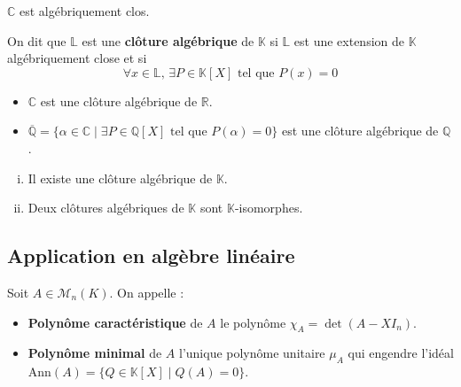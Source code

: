 	\begin{theorem}
		$\mathbb{C}$ est algébriquement clos.
	\end{theorem}
	
	\begin{definition}
		On dit que $\mathbb{L}$ est une \textbf{clôture algébrique} de $\mathbb{K}$ si $\mathbb{L}$ est une extension de $\mathbb{K}$ algébriquement close et si
		\[ \forall x \in \mathbb{L}, \, \exists P \in \mathbb{K}[X] \text{ tel que } P(x) = 0 \]
	\end{definition}
	
	\begin{example}
		\begin{itemize}
			\item $\mathbb{C}$ est une clôture algébrique de $\mathbb{R}$.
			\item $\overline{\mathbb{Q}} = \{ \alpha \in \mathbb{C} \mid \exists P \in \mathbb{Q}[X] \text{ tel que } P(\alpha) = 0 \}$ est une clôture algébrique de $\mathbb{Q}$.
		\end{itemize}
	\end{example}
	
	\begin{theorem}[Steinitz]
		\begin{enumerate}[(i)]
			\item Il existe une clôture algébrique de $\mathbb{K}$.
			\item Deux clôtures algébriques de $\mathbb{K}$ sont $\mathbb{K}$-isomorphes.
		\end{enumerate}
	\end{theorem}
	
	\subsection{Application en algèbre linéaire}
	
	
	\begin{definition}
		Soit $A \in \mathcal{M}_n(K)$. On appelle :
		\begin{itemize}
			\item \textbf{Polynôme caractéristique} de $A$ le polynôme $\chi_A = \det(A - XI_n)$.
			\item \textbf{Polynôme minimal} de $A$ l'unique polynôme unitaire $\mu_A$ qui engendre l'idéal $\mathrm{Ann}(A) = \{ Q \in \mathbb{K}[X] \mid Q(A) = 0 \}$.
		\end{itemize}
	\end{definition}
	
